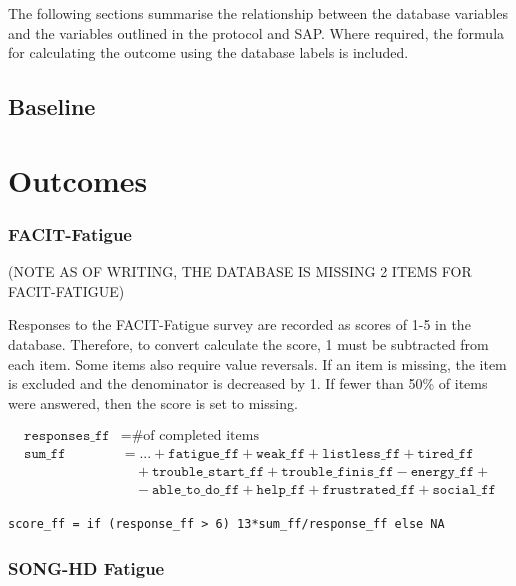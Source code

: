 \documentclass[11pt,parskip=half-]{scrartcl}
\begin{document}
The following sections summarise the relationship between the database variables and the variables outlined in the protocol and SAP.
Where required, the formula for calculating the outcome using the database labels is included.

\subsection*{Baseline}


\clearpage

\section*{Outcomes}

\subsubsection*{FACIT-Fatigue}

(NOTE AS OF WRITING, THE DATABASE IS MISSING 2 ITEMS FOR FACIT-FATIGUE)

Responses to the FACIT-Fatigue survey are recorded as scores of 1-5 in the database. Therefore, to convert calculate the score, 1 must be subtracted from each item. Some items also require value reversals. If an item is missing, the item is excluded and the denominator is decreased by 1. If fewer than 50\% of items were answered, then the score is set to missing.

$$
  \begin{aligned}
    \texttt{responses\_ff} & = \text{\# of completed items}                                                                \\
    \texttt{sum\_ff}       & = ... + \texttt{fatigue\_ff} + \texttt{weak\_ff} + \texttt{listless\_ff} + \texttt{tired\_ff} \\
                           & \quad+\texttt{trouble\_start\_ff}+\texttt{trouble\_finis\_ff}-\texttt{energy\_ff}+            \\
                           & \quad-\texttt{able\_to\_do\_ff}+\texttt{help\_ff}+\texttt{frustrated\_ff}+\texttt{social\_ff}
  \end{aligned}
$$

\begin{verbatim}
score_ff = if (response_ff > 6) 13*sum_ff/response_ff else NA
\end{verbatim}

\subsubsection*{SONG-HD Fatigue}
\end{document}
